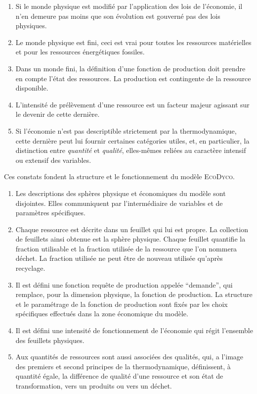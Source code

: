 \documentclass[12pt,a4paper]{article}%
\newcommand{\ed}{\textsc{EcoDyco}}
\begin{document}
\begin{enumerate}
\item Si le monde physique est modifié par l'application des lois de
l'économie, il n'en demeure pas moins que son évolution est gouverné pas des
lois physiques.

\item Le monde physique est fini, ceci est vrai pour toutes les ressources
matérielles et pour les ressources énergétiques fossiles.

\item Dans un monde fini, la définition d'une fonction de production doit prendre en compte l'état des ressources. La production est contingente de la ressource disponible.

\item L'intensité de prélèvement d'une ressource est un facteur majeur
agissant sur le devenir de cette dernière.

\item Si l'économie n'est pas descriptible strictement par la thermodynamique,
cette dernière peut lui fournir certaines catégories utiles, et, en
particulier, la distinction entre \textit{quantité} et \textit{qualité},
elles-mêmes reliées au caractère intensif ou extensif des variables.
\end{enumerate}


\noindent Ces constats fondent la structure et le fonctionnement du modèle \ed.

\begin{enumerate}
\item Les descriptions des sphères physique et économiques du modèle
sont disjointes. Elles communiquent par l'intermédiaire de variables et de paramètres 
spécifiques.

\item Chaque ressource est décrite dans un feuillet qui lui est propre. La collection de feuillets ainsi obtenue est la sphère physique. Chaque feuillet quantifie la fraction utilisable et la
fraction utilisée de la ressource que l'on nommera déchet. La fraction utilisée ne peut être
de nouveau utilisée qu'après recyclage.

\item Il est défini une fonction requête de production appelée ``demande'', qui
remplace, pour la dimension physique, la fonction de production. La structure et le paramétrage 
de la fonction de production sont fixés par les choix
spécifiques effectués dans la zone économique du modèle.

\item Il est défini une intensité de fonctionnement de l'économie qui régit
l'ensemble des feuillets physiques.

\item Aux quantités de ressources sont aussi associées des qualités, qui, a
l'image des premiers et second principes de la thermodynamique, définissent,
à quantité égale, la différence de qualité d'une ressource et son état de
transformation, vers un produits ou vers un déchet.
\end{enumerate}
\end{document}
